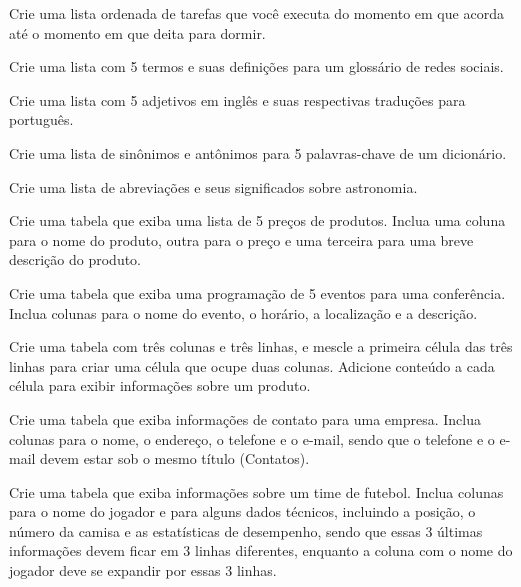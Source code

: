 \begin{exercise}
Crie uma lista ordenada de tarefas que você executa do momento em que acorda até o momento em que deita para dormir.
\end{exercise}

\begin{exercise}
Crie uma lista com 5 termos e suas definições para um glossário de redes sociais.
\end{exercise}

\begin{exercise}
Crie uma lista com 5 adjetivos em inglês e suas respectivas traduções para português.
\end{exercise}

\begin{exercise}
Crie uma lista de sinônimos e antônimos para 5 palavras-chave de um dicionário.
\end{exercise}

\begin{exercise}
Crie uma lista de abreviações e seus significados sobre astronomia.
\end{exercise}

\begin{exercise}
Crie uma tabela que exiba uma lista de 5 preços de produtos. Inclua uma coluna para o nome do produto, outra para o preço e uma terceira para uma breve descrição do produto.
\end{exercise}

\begin{exercise}
Crie uma tabela que exiba uma programação de 5 eventos para uma conferência. Inclua colunas para o nome do evento, o horário, a localização e a descrição.
\end{exercise}

\begin{exercise}
Crie uma tabela com três colunas e três linhas, e mescle a primeira célula das três linhas para criar uma célula que ocupe duas colunas. Adicione conteúdo a cada célula para exibir informações sobre um produto.
\end{exercise}

\begin{exercise}
Crie uma tabela que exiba informações de contato para uma empresa. Inclua colunas para o nome, o endereço, o telefone e o e-mail, sendo que o telefone e o e-mail devem estar sob o mesmo título (Contatos).
\end{exercise}

\begin{exercise}
Crie uma tabela que exiba informações sobre um time de futebol. Inclua colunas para o nome do jogador e para alguns dados técnicos, incluindo a posição, o número da camisa e as estatísticas de desempenho, sendo que essas 3 últimas informações devem ficar em 3 linhas diferentes, enquanto a coluna com o nome do jogador deve se expandir por essas 3 linhas.
\end{exercise}

